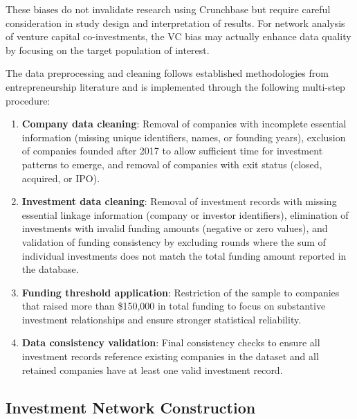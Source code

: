 These biases do not invalidate research using Crunchbase but require careful consideration in study design and interpretation of results. For network analysis of venture capital co-investments, the VC bias may actually enhance data quality by focusing on the target population of interest.

The data preprocessing and cleaning follows established methodologies from entrepreneurship literature \cite{Dalle2025} and is implemented through the following multi-step procedure:

\begin{enumerate}
    \item \textbf{Company data cleaning}: Removal of companies with incomplete essential information (missing unique identifiers, names, or founding years), exclusion of companies founded after 2017 to allow sufficient time for investment patterns to emerge, and removal of companies with exit status (closed, acquired, or IPO).
    
    \item \textbf{Investment data cleaning}: Removal of investment records with missing essential linkage information (company or investor identifiers), elimination of investments with invalid funding amounts (negative or zero values), and validation of funding consistency by excluding rounds where the sum of individual investments does not match the total funding amount reported in the database.
    
    \item \textbf{Funding threshold application}: Restriction of the sample to companies that raised more than \$150{,}000 in total funding to focus on substantive investment relationships and ensure stronger statistical reliability.
    
    
    \item \textbf{Data consistency validation}: Final consistency checks to ensure all investment records reference existing companies in the dataset and all retained companies have at least one valid investment record.
\end{enumerate}

\subsection{Investment Network Construction}

